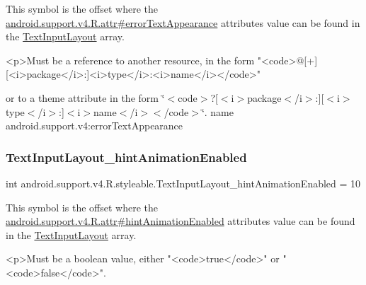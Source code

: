 This symbol is the offset where the \hyperlink{classandroid_1_1support_1_1v4_1_1R_1_1attr_a8af4dbdff7c093c06f9d39eb500ec3ec}{android.\+support.\+v4.\+R.\+attr\#error\+Text\+Appearance} attribute\textquotesingle{}s value can be found in the \hyperlink{classandroid_1_1support_1_1v4_1_1R_1_1styleable_a86943debf88d7a9dc4c0627a8546913d}{Text\+Input\+Layout} array.

\begin{DoxyVerb}      <p>Must be a reference to another resource, in the form "<code>@[+][<i>package</i>:]<i>type</i>:<i>name</i></code>"
\end{DoxyVerb}
 or to a theme attribute in the form \char`\"{}$<$code$>$?\mbox{[}$<$i$>$package$<$/i$>$\+:\mbox{]}\mbox{[}$<$i$>$type$<$/i$>$\+:\mbox{]}$<$i$>$name$<$/i$>$$<$/code$>$\char`\"{}.  name android.\+support.\+v4\+:error\+Text\+Appearance \mbox{\label{classandroid_1_1support_1_1v4_1_1R_1_1styleable_a4c514fcd5878b74c6f2da4d89d933eef}} 
\subsubsection{\texorpdfstring{Text\+Input\+Layout\+\_\+hint\+Animation\+Enabled}{TextInputLayout\_hintAnimationEnabled}}
{\footnotesize\ttfamily int android.\+support.\+v4.\+R.\+styleable.\+Text\+Input\+Layout\+\_\+hint\+Animation\+Enabled = 10\hspace{0.3cm}{\ttfamily [static]}}

This symbol is the offset where the \hyperlink{classandroid_1_1support_1_1v4_1_1R_1_1attr_af892acc4465801168a6992e839fecefc}{android.\+support.\+v4.\+R.\+attr\#hint\+Animation\+Enabled} attribute\textquotesingle{}s value can be found in the \hyperlink{classandroid_1_1support_1_1v4_1_1R_1_1styleable_a86943debf88d7a9dc4c0627a8546913d}{Text\+Input\+Layout} array.

\begin{DoxyVerb}      <p>Must be a boolean value, either "<code>true</code>" or "<code>false</code>".
\end{DoxyVerb}
 

